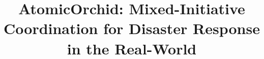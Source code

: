\documentclass{aamas2014}
\begin{document}


\title{AtomicOrchid: Mixed-Initiative Coordination for Disaster Response in the Real-World}




%
%
%
%

%

\end{document}
